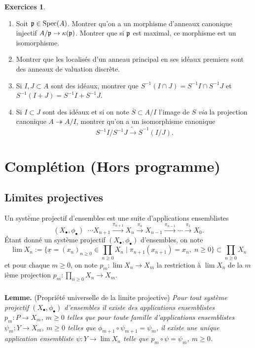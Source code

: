 \documentclass[a4paper, oneside, 12pt]{book}
\theoremstyle{theoremeStyle} %
\theoremstyle{definition} %
\newtheorem{exercices}[theoreme]{Exercices}
\DeclareMathOperator{\Spec}{Spec}
\begin{document}
		\begin{exercices}
	\begin{enumerate}
	\item Soit $\frak{p}\in \Spec(A)$. Montrer qu'on a un morphisme d'anneaux canonique injectif $A/\frak{p}\rightarrow \kappa(\frak{p})$. Montrer que si $\frak{p}$ est maximal, ce morphisme est un isomorphisme.
	\item Montrer que les localisés d'un anneau principal en ses idéaux premiers sont des anneaux de valuation discrète.
	\item Si $I,J\subset A$ sont des idéaux, montrer que  $S^{-1}(I\cap J)=S^{-1}I\cap S^{-1}J$ et $S^{-1}(I+J)=S^{-1}I+S^{-1}J$.
	\item  Si $I\subset J$ sont des idéaux et si on note $\overline{S}\subset A/I$ l'image de $S$ \textit{via} la projection canonique $A\twoheadrightarrow A/I$, montrer qu'on a un isomorphisme canonique $$S^{-1}I/S^{-1}J\tilde{\rightarrow}\overline{S}^{-1}(I/J).$$
	\end{enumerate}
		\end{exercices}
 \chapter{Complétion (Hors programme)}
 \section{Limites projectives}
 Un système projectif  d'ensembles est une suite d'applications ensemblistes $$(X_\bullet,\phi_\bullet)\;\; \cdots X_{n+1}\stackrel{\pi_{n+1}}{\rightarrow} X_n\stackrel{\pi_{n }}{\rightarrow}X_{n-1}\stackrel{\pi_{n-1}}{\rightarrow}\cdots \stackrel{\pi_{1}}{\rightarrow}X_0.$$
  Étant donné un système projectif $(X_\bullet,\phi_\bullet)$ d'ensembles, on note
  $$\lim X_n :=\lbrace \underline{x}=(x_n)_{n\geq 0}\in\prod_{n\geq 0}X_n\; |\; \pi_{n+1}(x_{n+1})=x_n,\; n\geq 0\rbrace\subset \prod_{n\geq 0}X_n$$
  et pour chaque $m\geq 0$, on note $p_m:\lim X_n\rightarrow X_m$ la  restriction à $\lim X_n$ de la $m$ième projection $p_m:\prod_{n\geq 0}X_n\rightarrow X_m$.

 \subsection{}\label{LimProj}\textbf{Lemme.} (Propriété universelle de la limite projective) \textit{Pour tout système projectif $(X_\bullet,\phi_\bullet)$ d'ensembles  il existe des applications ensemblistes $p_m:P\rightarrow X_m$, $m\geq 0$ telles que pour toute famille  d'applications ensemblistes $\psi_m:Y\rightarrow X_m$, $m\geq 0$ telles que $\phi_{m+1}\circ \psi_{m+1}=\psi_m$, il existe une unique application ensembliste $\psi:Y\rightarrow \lim X_n$ telle que $p_m\circ \psi=\psi_m$, $m\geq 0$.}\\
\end{document}
